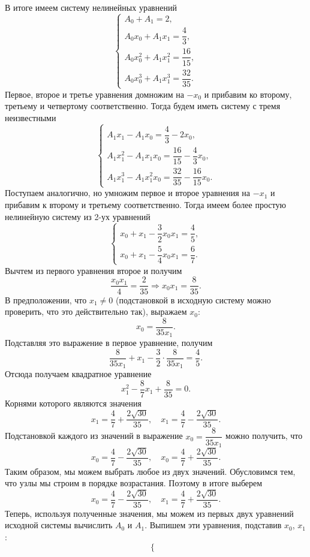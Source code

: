 \documentclass[a4paper, 12pt]{article}
\begin{document}
\begin{enumerate}
		В итоге имеем систему нелинейных уравнений $$\begin{cases} A_0 + A_1 = 2, \\ A_0x_0 + A_1x_1 = \dfrac43,\\ A_0x_0^2 + A_1x_1^2 = \dfrac{16}{15}, \\ A_0x_0^3 + A_1x_1^3 = \dfrac{32}{35}. \end{cases}$$
		Первое, второе и третье уравнения домножим на $-x_0$ и прибавим ко второму, третьему и четвертому соответственно. Тогда будем иметь систему с тремя неизвестными 
		$$
		\begin{cases}
			A_1x_1 - A_1x_0 = \dfrac43 - 2x_0,\\
			A_1x_1^2 - A_1x_1x_0 = \dfrac{16}{15} - \dfrac43x_0,\\
			A_1x_1^3 - A_1x_1^2x_0 = \dfrac{32}{35} - \dfrac{16}{15}x_0.
		\end{cases}
		$$
		Поступаем аналогично, но умножим первое и второе уравнения на $-x_1$ и прибавим к второму и третьему соответственно. Тогда имеем более простую нелинейную систему из 2-ух уравнений 
		$$
		\begin{cases}
			x_0 + x_1 - \dfrac32 x_0x_1 = \dfrac45,\\
			x_0 + x_1 - \dfrac54 x_0x_1 = \dfrac67.
		\end{cases}
		$$
		Вычтем из первого уравнения второе и получим $$\dfrac{x_0x_1}{4} = \dfrac{2}{35}\Rightarrow x_0x_1 = \dfrac{8}{35}.$$
		В предположении, что $x_1\ne 0$ (подстановкой в исходную систему можно проверить, что это действительно так), выражаем $x_0$:
		$$x_0 = \dfrac{8}{35x_1}.$$
		Подставляя это выражение в первое уравнение, получим $$\dfrac{8}{35x_1} + x_1 - \dfrac{3}{2}\cdot \dfrac{8}{35x_1} = \dfrac45.$$
		Отсюда получаем квадратное уравнение $$x_1^2 - \dfrac{8}{7} x_1 + \dfrac{8}{35} = 0.$$
		Корнями которого являются значения $$x_1 = \dfrac47 + \dfrac{2\sqrt{30}}{35},\quad x_1 = \dfrac47 - \dfrac{2\sqrt{30}}{35}.$$
		Подстановкой каждого из значений в выражение $x_0 = \dfrac{8}{35x_1}$ можно получить, что $$x_0 = \dfrac47 - \dfrac{2\sqrt{30}}{35},\quad x_0 = \dfrac47 +\dfrac{2\sqrt{30}}{35}.$$
		Таким образом, мы можем выбрать любое из двух значений. Обусловимся тем, что узлы мы строим в порядке возрастания. Поэтому в итоге выберем $$x_0 = \dfrac47 - \dfrac{2\sqrt{30}}{35},\quad x_1 = \dfrac47 +\dfrac{2\sqrt{30}}{35}.$$
		Теперь, используя полученные значения, мы можем из первых двух уравнений исходной системы вычислить $A_0$ и $A_1$. Выпишем эти уравнения, подставив $x_0$, $x_1$:
		$$\begin{cases}

\end{cases}$$
\end{enumerate}
\end{document}
